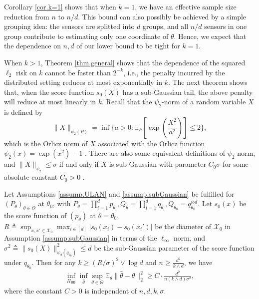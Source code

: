 \documentclass[final,12pt]{colt2018} %
\def \bE {\mathbb{E}}
\newcommand{\calX}{{\mathcal{X}}}
\begin{document}
Corollary \ref{cor.k=1} shows that when $k=1$, we have an effective sample size reduction from $n$ to $n/d$. This bound can also possibly be achieved by a simple grouping idea: the sensors are splitted into $d$ groups, and all $n/d$ sensors in one group contribute to estimating only one coordinate of $\theta$. Hence, we expect that the dependence on $n,d$ of our lower bound to be tight for $k=1$.

When $k>1$, Theorem \ref{thm.general} shows that the dependence of the squared $\ell_2$ risk on $k$ cannot be faster than $2^{-k}$, i.e., the penalty incurred by the distributed setting reduces at most exponentially in $k$. The next theorem shows that, {when the score function $s_{0}(X)$ has a sub-Gaussian tail}, the above penalty will reduce at most linearly in $k$. Recall that the $\psi_2$-norm of a random variable $X$ is defined by $$\|X\|_{\psi_2(P)}=\inf\{a>0: \bE_P[\exp(\frac{X^2}{a^2})]\le 2\},$$ which is the Orlicz norm of $X$ associated with the Orlicz function $\psi_2(x)=\exp(x^2)-1$ \cite{birnbaum1931verallgemeinerung}. There are also some equivalent definitions of $\psi_2$-norm, and $\|X\|_{\psi_2}\le \sigma$ if and only if $X$ is sub-Gaussian with parameter $C_0\sigma$ for some absolute constant $C_0>0$ \cite{vershynin2010introduction}. 

\begin{theorem}\label{thm.sub-gaussian}
	Let Assumptions \ref{assump.ULAN} and \ref{assump.subGaussian} be fulfilled for $(P_\theta)_{\theta\in\Theta}$ at $\theta_0$, with $P_\theta=\prod_{i=1}^d p_{\theta_i}, Q_\theta=\prod_{i=1}^d q_{\theta_i}, Q_{\theta_0}=q_{\theta_0}^{\otimes d}$. Let $s_0(x)$ be the score function of $(p_\theta)$ at $\theta=\theta_0$, $R\triangleq \sup_{x,x'\in \calX_0} \max_{i\in [d]} |s_{0}(x_i) - s_{0}(x_i')|$ be the diameter of $\calX_0$ in Assumption \ref{assump.subGaussian} in terms of the $\ell_\infty$ norm, and $\sigma^2\triangleq \|s_{0}(X)\|_{\psi_2(q_{\theta_0})}^2\le d$ be the sub-Gaussian parameter of the score function under $q_{\theta_0}$. Then for any $k\ge (R/\sigma)^2\vee \log d$ and $n\ge \frac{d^2}{k\wedge d}$, we have
	\begin{align*}
	\inf_{\Pi_{\mathsf{BB}} } \inf_{\hat{\theta}}\sup_{\theta\in\Theta} \bE_{\theta}\|\hat{\theta}-\theta\|_2^2 \ge C\cdot \frac{d^2}{n(k\wedge d)\sigma^2},
	\end{align*}
	where the constant $C>0$ is independent of $n,d,k,\sigma$. 
\end{theorem}
\end{document}
